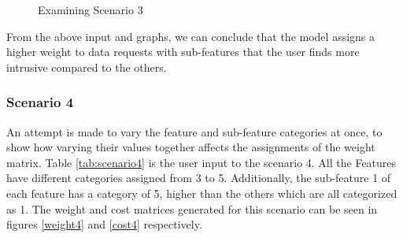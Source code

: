 \begin{figure}[htp]
  \caption{Examining Scenario 3}
  \label{fig:scenatio3}
\end{figure}


From the above input and graphs, we can conclude that the model assigns a higher weight to data requests with sub-features that the user finds more intrusive compared to the others.

\subsubsection{Scenario 4}
An attempt is made to vary the feature and sub-feature categories at once, to show how varying their values together affects the assignments of the weight matrix. Table \ref{tab:scenario4} is the user input to the scenario 4. All the Features have different categories assigned from 3 to 5. Additionally, the sub-feature 1 of each feature has a category of 5, higher than the others which are all categorized as 1. The weight and cost matrices generated for this scenario can be seen in figures \ref{weight4} and \ref{cost4} respectively. 

